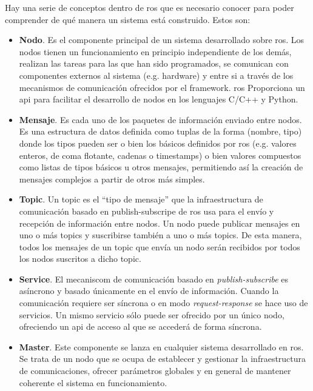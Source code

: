 Hay una serie de conceptos dentro de \ac{ros} que es necesario conocer para poder comprender de qué manera un sistema está construido. Estos son:

\begin{itemize}
	\item \textbf{Nodo}. Es el componente principal de un sistema desarrollado sobre \ac{ros}. Los nodos tienen un funcionamiento en principio independiente de los demás, realizan las tareas para las que han sido programados, se comunican con componentes externos al sistema (e.g. hardware) y entre si a través de los mecanismos de comunicación ofrecidos por el \ac{framework}. \ac{ros} Proporciona un \ac{api} para facilitar el desarrollo de nodos en los lenguajes C/C++ y Python.
	\item \textbf{Mensaje}. Es cada uno de los paquetes de información enviado entre nodos. Es una estructura de datos definida como tuplas de la forma (nombre, tipo) donde los tipos pueden ser o bien los básicos definidos por ros (e.g. valores enteros, de coma flotante, cadenas o timestamps) o bien valores compuestos como listas de tipos básicos u otros mensajes, permitiendo así la creación de mensajes complejos a partir de otros más simples.
	\item \textbf{Topic}. Un topic es el \enquote{tipo de mensaje} que la infraestructura de comunicación basado en publish-subscripe de \ac{ros} usa para el envío y recepción de información entre nodos. Un nodo puede publicar mensajes en uno o más topics y suscribirse también a uno o más topics. De esta manera, todos los mensajes de un topic que envía un nodo serán recibidos por todos los nodos suscritos a dicho topic.
	\item \textbf{Service}. El mecaniscom de comunicación basado en \textit{publish-subscribe} es asíncrono y basado únicamente en el envío de información. Cuando la comunicación requiere ser síncrona o en modo \textit{request-response} se hace uso de servicios. Un mismo servicio sólo puede ser ofrecido por un único nodo, ofreciendo un \ac{api} de acceso al que se accederá de forma síncrona.
	\item \textbf{Master}. Este componente se lanza en cualquier sistema desarrollado en \ac{ros}. Se trata de un nodo que se ocupa de establecer y gestionar la infraestructura de comunicaciones, ofrecer parámetros globales y en general de mantener coherente el sistema en funcionamiento.
\end{itemize}